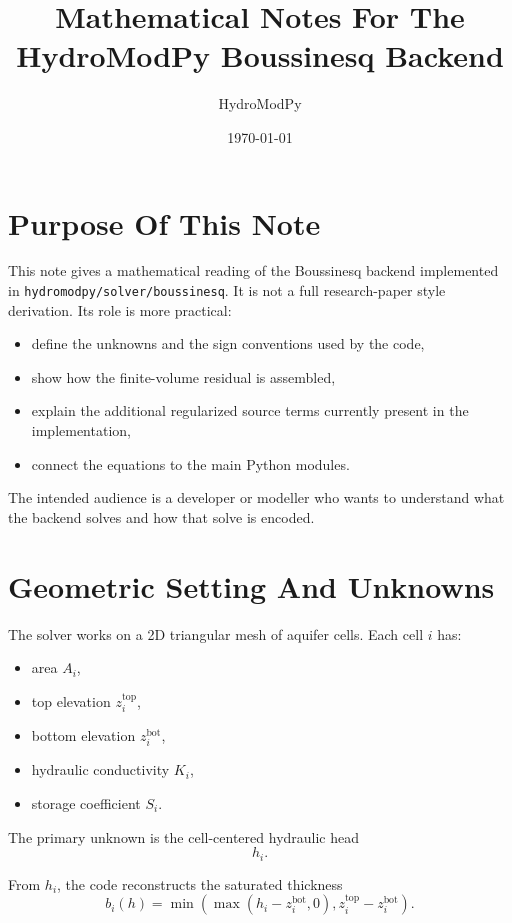 \documentclass[11pt,a4paper]{article}
\title{Mathematical Notes For The HydroModPy Boussinesq Backend}
\author{HydroModPy}
\date{\today}
\begin{document}
\maketitle
\tableofcontents

\section{Purpose Of This Note}

This note gives a mathematical reading of the Boussinesq backend implemented in
\texttt{hydromodpy/solver/boussinesq}. It is not a full research-paper style
derivation. Its role is more practical:

\begin{itemize}
\item define the unknowns and the sign conventions used by the code,
\item show how the finite-volume residual is assembled,
\item explain the additional regularized source terms currently present in the
      implementation,
\item connect the equations to the main Python modules.
\end{itemize}

The intended audience is a developer or modeller who wants to understand what
the backend solves and how that solve is encoded.

\section{Geometric Setting And Unknowns}

The solver works on a 2D triangular mesh of aquifer cells. Each cell $i$ has:

\begin{itemize}
\item area $A_i$,
\item top elevation $z^{\text{top}}_i$,
\item bottom elevation $z^{\text{bot}}_i$,
\item hydraulic conductivity $K_i$,
\item storage coefficient $S_i$.
\end{itemize}

The primary unknown is the cell-centered hydraulic head
\[
h_i.
\]

From $h_i$, the code reconstructs the saturated thickness
\[
b_i(h) = \min\!\left(
    \max\!\left(h_i - z^{\text{bot}}_i, 0\right),
    z^{\text{top}}_i - z^{\text{bot}}_i
\right).
\]
\end{document}
